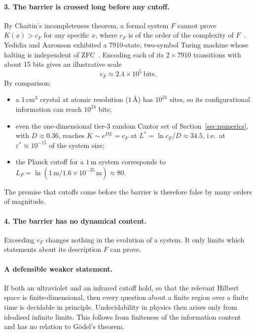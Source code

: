 \documentclass[11pt]{article}
\theoremstyle{definition}\newtheorem{definition}{Definition}[section]
\theoremstyle{remark}\newtheorem*{remark}{Remark}
\newcommand{\Kc}{K}
\begin{document}
\paragraph{3. The barrier is crossed long before any cutoff.} By Chaitin's incompleteness theorem, a formal system
$F$ cannot prove $\Kc(x)>c_F$ for any specific $x$, where $c_F$ is of the order of the complexity of
$F$~\cite{Chaitin74}. Yedidia and Aaronson exhibited a 7910-state, two-symbol Turing machine whose halting is
independent of ZFC~\cite{YA}. Encoding each of its $2\times7910$ transitions with about 15 bits gives an
illustrative scale
\begin{equation}
c_F\approx2.4\times10^5\ \text{bits}.
\end{equation}
By comparison:
\begin{itemize}
\item a $1\,\mathrm{cm}^3$ crystal at atomic resolution ($1$\,\AA) has $10^{24}$ sites, so its configurational
information can reach $10^{24}$ bits;
\item even the one-dimensional tier-3 random Cantor set of Section~\ref{sec:numerics}, with $D\approx0.36$, reaches
$\Kc\sim e^{DL}=c_F$ at $L^*=\ln c_F/D\approx34.5$, i.e.\ at $\varepsilon^*\approx10^{-15}$ of the system size;
\item the Planck cutoff for a $1$\,m system corresponds to $L_P=\ln(1\,\mathrm m/1.6\times10^{-35}\,\mathrm m)\approx80$.
\end{itemize}
The premise that cutoffs come before the barrier is therefore false by many orders of magnitude.

\paragraph{4. The barrier has no dynamical content.} Exceeding $c_F$ changes nothing in the evolution of a
system. It only limits which statements about its description $F$ can prove.

\paragraph{A defensible weaker statement.} If both an ultraviolet and an infrared cutoff hold, so that the
relevant Hilbert space is finite-dimensional, then every question about a finite region over a finite time is
decidable in principle. Undecidability in physics then arises only from idealised infinite limits. This
follows from finiteness of the information content and has no relation to G\"odel's theorem.
\end{document}
